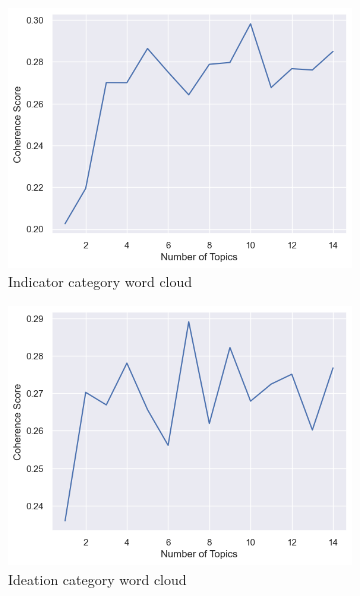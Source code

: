\documentclass[sn-mathphys,Numbered]{sn-jnl}%
\theoremstyle{thmstyleone}%
\theoremstyle{thmstyletwo}%
\theoremstyle{thmstylethree}%
\begin{document}
\begin{figure}[h!]
\centering
\begin{subfigure}{0.45\textwidth}
    \includegraphics[width=\textwidth]{cv_indicator.png}
    \caption{Indicator category word cloud}
    \label{redditdist}
\end{subfigure}
\hfill
\begin{subfigure}{0.45\textwidth}
    \includegraphics[width=\textwidth]{cv_ideation.png}
    \caption{Ideation category word cloud}
    \label{twitterdist}
\end{subfigure}      
\centering
\begin{subfigure}{0.45\textwidth}

\end{subfigure}
\end{figure}
\end{document}
